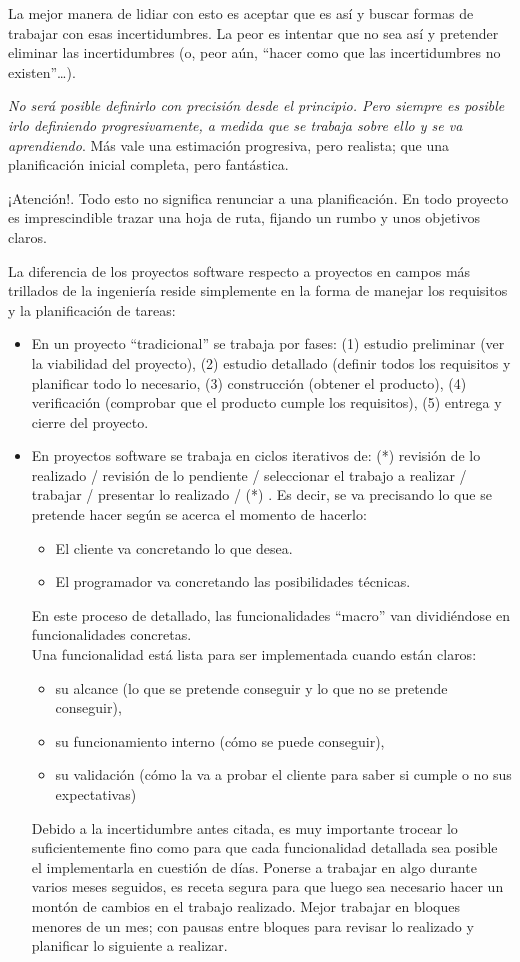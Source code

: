 \documentclass[spanish,12pt,a4paper,final,oneside]{book}
\begin{document}
La mejor manera de lidiar con esto es aceptar que es así y buscar formas de trabajar con esas incertidumbres. La peor es intentar que no sea así y pretender eliminar las incertidumbres (o, peor aún, ``hacer como que las incertidumbres no existen''…).

\textit{No será posible definirlo con precisión desde el principio. Pero siempre es posible irlo definiendo progresivamente, a medida que se trabaja sobre ello y se va aprendiendo}. Más vale una estimación progresiva, pero realista; que una planificación inicial completa, pero fantástica.

¡Atención!. Todo esto no significa renunciar a una planificación. En todo proyecto es imprescindible trazar una hoja de ruta, fijando un rumbo y unos objetivos claros. 

La diferencia de los proyectos software respecto a proyectos en campos más trillados de la ingeniería reside simplemente en la forma de manejar los requisitos y la planificación de tareas:
\begin{itemize}
\item En un proyecto ``tradicional'' se trabaja por fases: (1) estudio preliminar (ver la viabilidad del proyecto), (2) estudio detallado (definir todos los requisitos y planificar todo lo necesario, (3) construcción (obtener el producto), (4) verificación (comprobar que el producto cumple los requisitos), (5) entrega y cierre del proyecto.
\item En proyectos software se trabaja en ciclos iterativos de: (*) revisión de lo realizado / revisión de lo pendiente / seleccionar el trabajo a realizar / trabajar / presentar lo realizado / (*) . Es decir, se va precisando lo que se pretende hacer según se acerca el momento de hacerlo:
\begin{itemize}
\item El cliente va concretando lo que desea.
\item El programador va concretando las posibilidades técnicas.
\end{itemize}
En este proceso de detallado, las funcionalidades ``macro'' van dividiéndose en funcionalidades concretas.
\\Una funcionalidad está lista para ser implementada cuando están claros:
\begin{itemize}
\item su alcance (lo que se pretende conseguir y lo que no se pretende conseguir), 
\item su funcionamiento interno (cómo se puede conseguir),
\item su validación (cómo la va a probar el cliente para saber si cumple o no sus expectativas)
\end{itemize} 
Debido a la incertidumbre antes citada, es muy importante trocear lo suficientemente fino como para que cada funcionalidad detallada sea posible el implementarla en cuestión de días. Ponerse a trabajar en algo durante varios meses seguidos, es receta segura para que luego sea necesario hacer un montón de cambios en el trabajo realizado. Mejor trabajar en bloques menores de un mes; con pausas entre bloques para revisar lo realizado y planificar lo siguiente a realizar.
\end{itemize}
\end{document}
